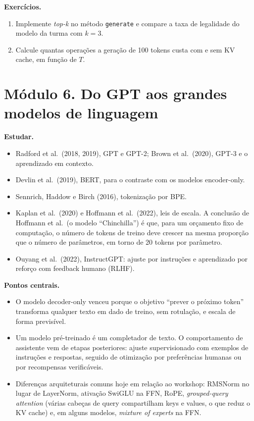 \documentclass[
  11pt,
]{article}
\providecommand{\tightlist}{%
  \setlength{\itemsep}{0pt}\setlength{\parskip}{0pt}}
\begin{document}
\textbf{Exercícios.}

\begin{enumerate}
\def\labelenumi{\arabic{enumi}.}
\tightlist
\item
  Implemente \emph{top-k} no método \texttt{generate} e compare a taxa
  de legalidade do modelo da turma com \(k = 3\).
\item
  Calcule quantas operações a geração de 100 tokens custa com e sem KV
  cache, em função de \(T\).
\end{enumerate}

\section{Módulo 6. Do GPT aos grandes modelos de
linguagem}\label{muxf3dulo-6.-do-gpt-aos-grandes-modelos-de-linguagem}

\textbf{Estudar.}

\begin{itemize}
\tightlist
\item
  Radford et al.~(2018, 2019), GPT e GPT-2; Brown et al.~(2020), GPT-3 e
  o aprendizado em contexto.
\item
  Devlin et al.~(2019), BERT, para o contraste com os modelos
  encoder-only.
\item
  Sennrich, Haddow e Birch (2016), tokenização por BPE.
\item
  Kaplan et al.~(2020) e Hoffmann et al.~(2022), leis de escala. A
  conclusão de Hoffmann et al.~(o modelo ``Chinchilla'') é que, para um
  orçamento fixo de computação, o número de tokens de treino deve
  crescer na mesma proporção que o número de parâmetros, em torno de 20
  tokens por parâmetro.
\item
  Ouyang et al.~(2022), InstructGPT: ajuste por instruções e aprendizado
  por reforço com feedback humano (RLHF).
\end{itemize}

\textbf{Pontos centrais.}

\begin{itemize}
\tightlist
\item
  O modelo decoder-only venceu porque o objetivo ``prever o próximo
  token'' transforma qualquer texto em dado de treino, sem rotulação, e
  escala de forma previsível.
\item
  Um modelo pré-treinado é um completador de texto. O comportamento de
  assistente vem de etapas posteriores: ajuste supervisionado com
  exemplos de instruções e respostas, seguido de otimização por
  preferências humanas ou por recompensas verificáveis.
\item
  Diferenças arquiteturais comuns hoje em relação ao workshop: RMSNorm
  no lugar de LayerNorm, ativação SwiGLU na FFN, RoPE,
  \emph{grouped-query attention} (várias cabeças de query compartilham
  keys e values, o que reduz o KV cache) e, em alguns modelos,
  \emph{mixture of experts} na FFN.
\end{itemize}
\end{document}
